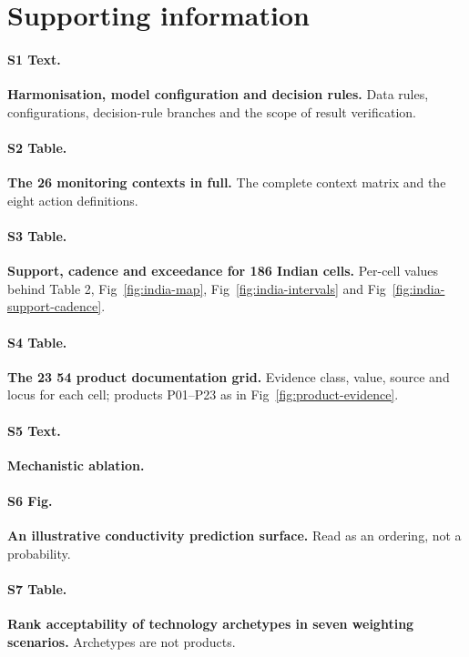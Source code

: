 \documentclass[10pt,letterpaper]{article}
\begin{document}
\linenumbers
\section*{Supporting information}

\paragraph*{S1 Text.}
\label{S1_Text}
\textbf{Harmonisation, model configuration and decision rules.} Data rules, configurations, decision-rule branches and the scope of result verification.

\paragraph*{S2 Table.}
\label{S2_Table}
\textbf{The 26 monitoring contexts in full.} The complete context matrix and the eight action definitions.

\paragraph*{S3 Table.}
\label{S3_Table}
\textbf{Support, cadence and exceedance for 186 Indian cells.} Per-cell values behind Table 2, Fig~\ref{fig:india-map}, Fig~\ref{fig:india-intervals} and Fig~\ref{fig:india-support-cadence}.

\paragraph*{S4 Table.}
\label{S4_Table}
\textbf{The 23 \texttimes{} 54 product documentation grid.} Evidence class, value, source and locus for each cell; products P01--P23 as in Fig~\ref{fig:product-evidence}.

\paragraph*{S5 Text.}
\label{S5_Text}
\textbf{Mechanistic ablation.}

\paragraph*{S6 Fig.}
\label{S6_Fig}
\textbf{An illustrative conductivity prediction surface.} Read as an ordering, not a probability.

\paragraph*{S7 Table.}
\label{S7_Table}
\textbf{Rank acceptability of technology archetypes in seven weighting scenarios.} Archetypes are not products.
\end{document}

